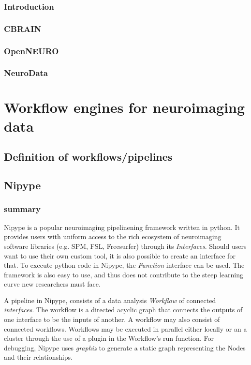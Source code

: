 \documentclass{report}
\begin{document}
        		\subsection{Introduction}
		\subsection{CBRAIN}
		\subsection{OpenNEURO}
		\subsection{NeuroData}
\chapter{Workflow engines for neuroimaging data}
	\section{Definition of workflows/pipelines}
	\section{Nipype}
		\subsection{summary}
		Nipype\cite{nipype} is a popular neuroimaging pipelinening framework written in python.
		It provides users with uniform access to the rich ecosystem of neuroimaging software
		libraries (e.g. SPM, FSL, Freesurfer) through its \textit{Interfaces}. Should users want to
		use their own custom tool, it is also possible to create an interface for that. To execute 
		python code in Nipype, the \textit{Function} interface can be used. The framework is 
		also easy to use, and thus does not contribute to the steep learning curve new
		researchers must face.
		
		A pipeline in Nipype, consists of a data analysis \textit{Workflow} of connected \textit{interfaces}. The workflow is a directed acyclic graph that connects the outputs of one interface to be the inputs of another. A workflow may also consist of connected workflows. Workflows may be executed in parallel either locally or an a cluster through the use of a plugin in the Workflow's run function. For debugging, Nipype uses \textit{graphiz} to generate a static graph representing the Nodes and their relationships.
		
\end{document}
